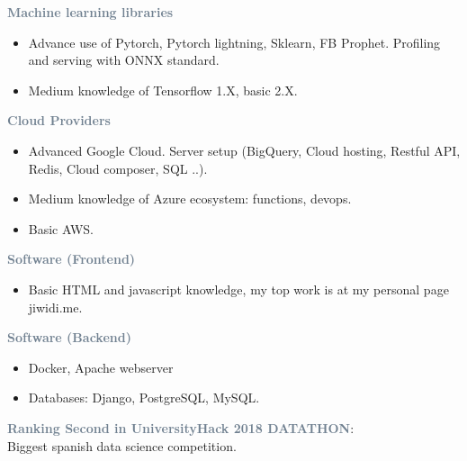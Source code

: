 

\textcolor{SlateGrey}{\textbf{Machine learning libraries}}
\newline

\begin{itemize}
    \item Advance use of Pytorch, Pytorch lightning, Sklearn, FB Prophet. Profiling and serving with ONNX standard.
    \item Medium knowledge of Tensorflow 1.X, basic 2.X.
\end{itemize}

\textcolor{SlateGrey}{\textbf{Cloud Providers}}
\newline

\begin{itemize}
    \item Advanced Google Cloud. Server setup (BigQuery, Cloud hosting, Restful API, Redis, Cloud composer, SQL ..).
    \item Medium knowledge of Azure ecosystem: functions, devops.
    \item Basic AWS.
\end{itemize}

\textcolor{SlateGrey}{\textbf{Software (Frontend)}}
\newline

\begin{itemize}
    \item Basic HTML and javascript knowledge, my top work is at my personal page jiwidi.me.
\end{itemize}

\textcolor{SlateGrey}{\textbf{Software (Backend)}}
\newline

\begin{itemize}
    \item Docker, Apache webserver
    \item Databases: Django, PostgreSQL, MySQL. 
\end{itemize}



\textcolor{SlateGrey}{\textbf{Ranking Second in UniversityHack 2018 DATATHON}}: \\ Biggest spanish data science competition.
\newline

